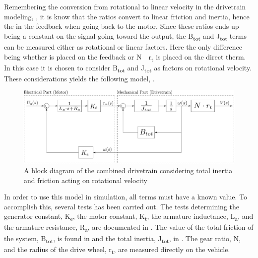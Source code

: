 Remembering the conversion from rotational to linear velocity in the drivetrain modeling, , it is know that the ratios convert to linear friction and inertia, hence the \si{} in the feedback when going back to the motor. Since these ratios ends up being a constant on the signal going toward the output, the \si{B_{tot}} and \si{J_{tot}} terms can be measured either as rotational or linear factors. Here the only difference being whether \si{} is placed on the feedback or \si{N\cdot r_t} is placed on the direct therm. In this case it is chosen to consider \si{B_{tot}} and \si{J_{tot}} as factors on rotational velocity. These considerations yields the following model, .
%
\begin{figure}[H]
	\centering
	\includegraphics[width=\textwidth]{figures/totalVelocityModelDiagramNotComplicated.pdf}
	\caption{A block diagram of the combined drivetrain considering total inertia and friction acting on rotational velocity}
	\label{fig:BlockDiagramDrivetrainNotComplicated}
\end{figure}
%
In order to use this model in simulation, all terms must have a known value. To accomplish this, several tests has been carried out. The tests determining the generator constant, \si{K_e}, the motor constant, \si{K_t}, the armature inductance, \si{L_a}, and the armature resistance, \si{R_a}, are documented in . The value of the total friction of the system, \si{B_{tot}}, is found in  and the total inertia, \si{J_{tot}}, in . The gear ratio, \si{N}, and the radius of the drive wheel, \si{r_t}, are measured directly on the vehicle.